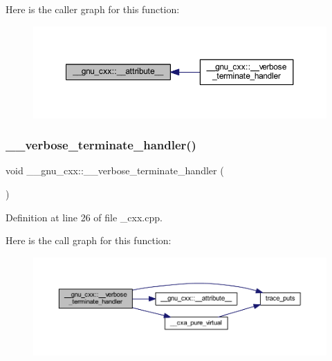 Here is the caller graph for this function\+:
\nopagebreak
\begin{figure}[H]
\begin{center}
\leavevmode
\includegraphics[width=350pt]{namespace____gnu__cxx_acf548952d6d5eb7ed0583d1abedb4164_icgraph}
\end{center}
\end{figure}
\mbox{\label{namespace____gnu__cxx_af51888cedbc669a114cd79e39e0cd9be}} 
\subsubsection{\texorpdfstring{\+\_\+\+\_\+verbose\+\_\+terminate\+\_\+handler()}{\_\_verbose\_terminate\_handler()}}
{\footnotesize\ttfamily void \+\_\+\+\_\+gnu\+\_\+cxx\+::\+\_\+\+\_\+verbose\+\_\+terminate\+\_\+handler (\begin{DoxyParamCaption}{ }\end{DoxyParamCaption})}



Definition at line 26 of file \+\_\+cxx.\+cpp.

Here is the call graph for this function\+:
\nopagebreak
\begin{figure}[H]
\begin{center}
\leavevmode
\includegraphics[width=350pt]{namespace____gnu__cxx_af51888cedbc669a114cd79e39e0cd9be_cgraph}
\end{center}
\end{figure}
